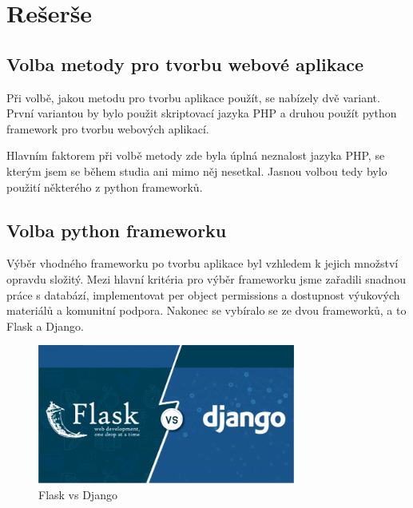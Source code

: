 \chapter{Rešerše}
\label{1-reserse}

\section{Volba metody pro tvorbu webové aplikace}

Při volbě, jakou metodu pro tvorbu aplikace použít, se nabízely dvě
variant. První variantou by bylo použit skriptovací jazyka PHP a
druhou použít python framework pro tvorbu webových aplikací.

Hlavním faktorem při volbě metody zde byla úplná neznalost jazyka PHP,
se kterým jsem se během studia ani mimo něj nesetkal. Jasnou volbou
tedy bylo použití některého z python frameworků.

\section{Volba python frameworku}
Výběr vhodného frameworku po tvorbu aplikace byl vzhledem k jejich
množství opravdu složitý. Mezi hlavní kritéria pro výběr frameworku
jsme zařadili snadnou práce s databází, implementovat per object
permissions a dostupnost výukových materiálů a komunitní
podpora. Nakonec se vybíralo se ze dvou frameworků, a to Flask a
Django.

\begin{figure}[H] \centering
    \includegraphics[width=240pt]{./pictures/1-django-vs-flask.jpeg}
    \caption[Flask vs Django]{Flask vs Django \cite{}}
	\label{fig:Flask vs Django}                                
\end{figure}

